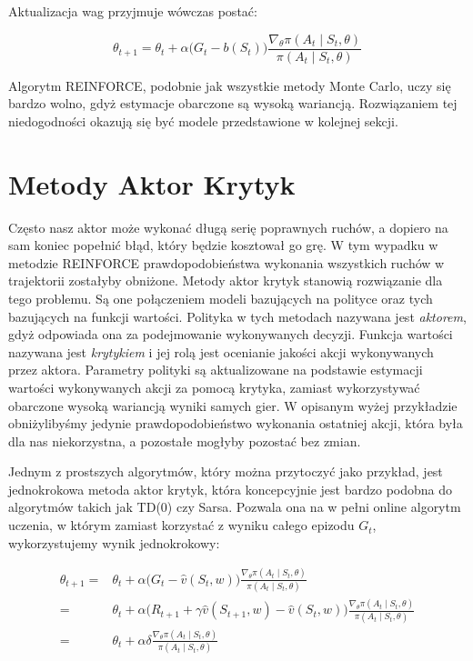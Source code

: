 \documentclass[licencjacka]{pracamgr}
\begin{document}
Aktualizacja wag przyjmuje wówczas postać:

$$ \theta_{t+1} = \theta_t + \alpha \Big( G_t - b(S_t) \Big) \frac{\nabla_\theta \pi(A_t \mid S_t, \theta)}{\pi(A_t \mid S_t, \theta)} $$


Algorytm REINFORCE, podobnie jak wszystkie metody Monte Carlo, uczy się bardzo wolno, gdyż estymacje obarczone są wysoką wariancją. Rozwiązaniem tej niedogodności okazują się być modele przedstawione w kolejnej sekcji.

\section{Metody Aktor Krytyk}

Często nasz aktor może wykonać długą serię poprawnych ruchów, a dopiero na sam koniec popełnić błąd, który będzie kosztował go grę. W tym wypadku w metodzie REINFORCE prawdopodobieństwa wykonania wszystkich ruchów w trajektorii zostałyby obniżone. Metody aktor krytyk stanowią rozwiązanie dla tego problemu. Są one połączeniem modeli bazujących na polityce oraz tych bazujących na funkcji wartości. Polityka w tych metodach nazywana jest \emph{aktorem}, gdyż odpowiada ona za podejmowanie wykonywanych decyzji. Funkcja wartości nazywana jest \emph{krytykiem} i jej rolą jest ocenianie jakości akcji wykonywanych przez aktora. Parametry polityki są aktualizowane na podstawie estymacji wartości wykonywanych akcji za pomocą krytyka, zamiast wykorzystywać obarczone wysoką wariancją wyniki samych gier. W opisanym wyżej przykładzie obniżylibyśmy jedynie prawdopodobieństwo wykonania ostatniej akcji, która była dla nas niekorzystna, a pozostałe mogłyby pozostać bez zmian.

Jednym z prostszych algorytmów, który można przytoczyć jako przykład, jest jednokrokowa metoda aktor krytyk, która koncepcyjnie jest bardzo podobna do algorytmów takich jak TD(0) czy Sarsa. Pozwala ona na w pełni online algorytm uczenia, w którym zamiast korzystać z wyniku całego epizodu $G_t$, wykorzystujemy wynik jednokrokowy:

\begin{align*}
\theta_{t+1} =& \theta_t + \alpha \Big( G_t - \hat{v}(S_t, w) \Big) \frac{\nabla_\theta \pi(A_t \mid S_t, \theta)}{\pi(A_t \mid S_t, \theta)} \\
=& \theta_t + \alpha \Big( R_{t+1} + \gamma \hat{v}(S_{t+1}, w) - \hat{v}(S_t, w) \Big) \frac{\nabla_\theta \pi(A_t \mid S_t, \theta)}{\pi(A_t \mid S_t, \theta)} \\
=& \theta_t + \alpha \delta \frac{\nabla_\theta \pi(A_t \mid S_t, \theta)}{\pi(A_t \mid S_t, \theta)}
\end{align*}
\end{document}

